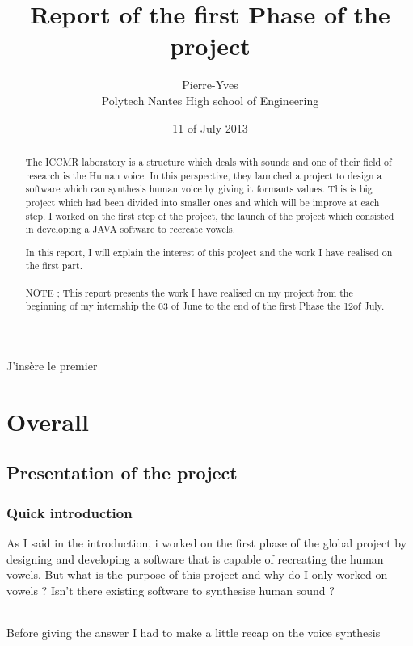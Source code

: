 \documentclass[12pt]{report}
\title{Report of the first Phase of the project}
\author{Pierre-Yves \bsc{Hervo} \\Polytech Nantes High school of Engineering }
\date{11\up{th} of July 2013}
\begin{document}
\maketitle

\begin{abstract}

The ICCMR laboratory is a structure which deals with sounds and one of their field of research is the Human voice. In this perspective, they launched a project to design a software which can synthesis human voice by giving it formants values. This is big project which had been divided into smaller ones and which will be improve at each step. I worked on the first step of the project, the launch of the project which consisted in developing a JAVA software to recreate vowels. 

In this report, I will explain the interest of this project and the work I have realised on the first part.
\paragraph{}
NOTE ; This report presents the work I have realised on my project from the beginning of my internship the 03 of June to the end of the first Phase the 12of July.

\end{abstract}

\renewcommand{\contentsname}{Sommaire}
\tableofcontents

J'insère le premier \cite{ref}  \cite{ref2} \cite{ref3} \cite{ref4}


\part{Overall}
\chapter{Presentation of the project}
\section{Quick introduction}
As I said in the introduction, i worked on the first phase of the global project by designing and developing a software that is capable of recreating the human vowels.
But what is the purpose of this project and why do I only worked on vowels ?
Isn't there existing software to synthesise human sound ?
\paragraph{}
Before giving the answer I had to make a little recap on the voice synthesis
 
\end{document}
